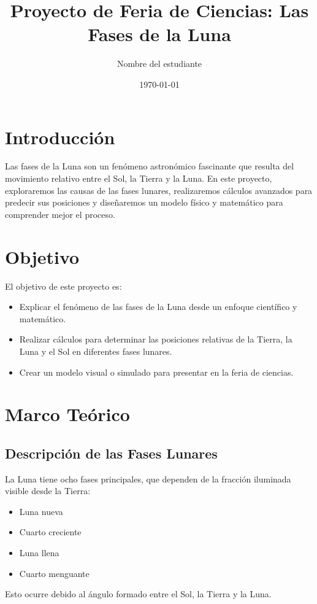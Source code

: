 \documentclass[12pt]{article}
\title{\textbf{Proyecto de Feria de Ciencias: Las Fases de la Luna}}
\author{Nombre del estudiante}
\date{\today}
\begin{document}
\maketitle

\tableofcontents

\newpage

\section{Introducción}
Las fases de la Luna son un fenómeno astronómico fascinante que resulta del movimiento relativo entre el Sol, la Tierra y la Luna. En este proyecto, exploraremos las causas de las fases lunares, realizaremos cálculos avanzados para predecir sus posiciones y diseñaremos un modelo físico y matemático para comprender mejor el proceso.

\section{Objetivo}
El objetivo de este proyecto es:
\begin{itemize}
    \item Explicar el fenómeno de las fases de la Luna desde un enfoque científico y matemático.
    \item Realizar cálculos para determinar las posiciones relativas de la Tierra, la Luna y el Sol en diferentes fases lunares.
    \item Crear un modelo visual o simulado para presentar en la feria de ciencias.
\end{itemize}

\section{Marco Teórico}
\subsection{Descripción de las Fases Lunares}
La Luna tiene ocho fases principales, que dependen de la fracción iluminada visible desde la Tierra:
\begin{itemize}
    \item Luna nueva
    \item Cuarto creciente
    \item Luna llena
    \item Cuarto menguante
\end{itemize}
Esto ocurre debido al ángulo formado entre el Sol, la Tierra y la Luna.
\end{document}
